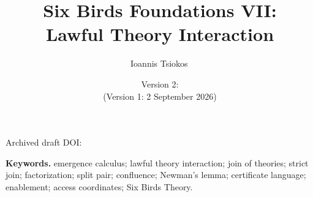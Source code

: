 \documentclass[11pt]{article}
\title{Six Birds Foundations VII:\\
Lawful Theory Interaction}
\author{Ioannis Tsiokos\,\orcidlink{0009-0009-7659-5964}}
\date{Version 2: \manuscriptdate\\[2pt] \footnotesize (Version 1: 2 September 2026)}
\theoremstyle{definition}
\theoremstyle{plain}\newtheorem*{headline}{Theorem}
\begin{document}
\maketitle
\thispagestyle{firstpage}
\ifpaperhasdoi
\begin{center}
\small Archived draft DOI: \doi{\paperdoi}
\end{center}
\fi

\begin{abstract}

\end{abstract}

\medskip
\noindent\textbf{Keywords.} emergence calculus; lawful theory interaction; join of theories; strict join;
factorization; split pair; confluence; Newman's lemma; certificate language; enablement;
access coordinates; Six Birds Theory.












\clearpage


\end{document}
